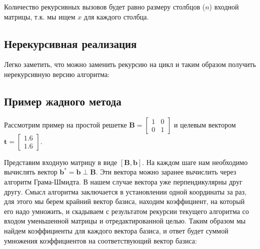 Количество рекурсивных вызовов будет равно размеру столбцов ($ n $) входной матрицы, т.к. мы ищем $ x $ для каждого столбца.

\subsection{Нерекурсивная реализация}

Легко заметить, что можно заменить рекурсию на цикл и таким образом получить нерекурсивную версию алгоритма:

\begin{algorithmic}

\EndFor
\end{algorithmic}

\subsection{Пример жадного метода}

Рассмотрим пример на простой решетке $ \mathbf{B} = \left[\begin{array}{cccc}
1 & 0 \\
0 & 1
\end{array}\right] $ и целевым вектором $ \mathbf{t} = \left[\begin{array}{cccc}
1.6 \\
1.6
\end{array}\right] $.

Представим входную матрицу в виде $ \left[\mathbf{B}, \mathbf{b}\right] $. На каждом шаге нам необходимо вычислять вектор $ \mathbf{b}^* = \mathbf{b} \perp \mathbf{B} $. Эти вектора можно заранее вычислить через алгоритм Грама-Шмидта. В нашем случае вектора уже перпендикулярны друг другу. Смысл алгоритма заключается в установлении одной координаты за раз, для этого мы берем крайний вектор базиса, находим коэффициент, на который его надо умножить, и скадываем с результатом рекурсии текущего алгоритма со входом уменьшенной матрицы и отредактированной целью. Таким образом мы найдем коэффициенты для каждого вектора базиса, и ответ будет суммой умножения коэффициентов на соответствующий вектор базиса:

